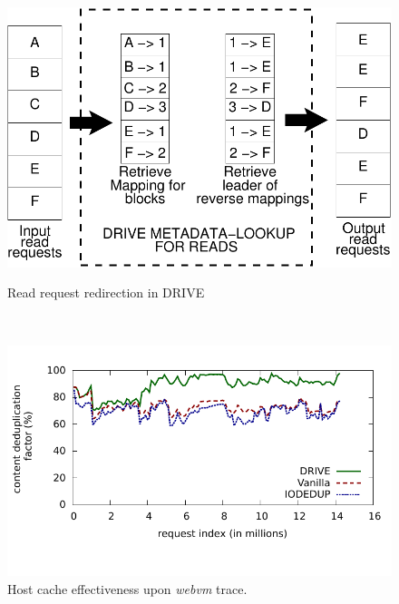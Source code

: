 \begin{figure}
    \RawFloats
    \begin{minipage}{0.45\textwidth}
    \centering
    \includegraphics[scale=0.5]{confided-figures/main/dedup-working-reads.pdf}
    \caption{Read request redirection in DRIVE}
    \label{fig:confided-working(a)}
	\end{minipage}
	~~~~~
    \begin{minipage}{0.55\textwidth}
    \centering
	\includegraphics[scale=0.8]{confided-figures/contentdedup-factor/contentdedupfactor.pdf}
	\vspace{-0.6in}
	\caption{Host cache effectiveness upon \textit{webvm} trace.}
	\label{fig:contentdedup-factor-timeseries}
	\end{minipage}
\end{figure}

